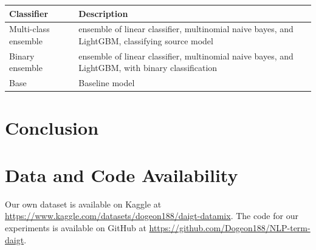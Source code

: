 \documentclass[conference]{IEEEtran}
\begin{document}
\begin{table}[htbp]
  \begin{tabular}{ll}
    \hline
    \textbf{Classifier} & \textbf{Description} \\
    \hline
    Multi-class ensemble & ensemble of linear classifier, multinomial naive bayes, and LightGBM, classifying source model \\
    Binary ensemble & ensemble of linear classifier, multinomial naive bayes, and LightGBM, with binary classification \\
    Base & Baseline model \\
    \hline
    
  \end{tabular}
\end{table}


\section{Conclusion}

\section{Data and Code Availability}

Our own dataset is available on Kaggle at \url{https://www.kaggle.com/datasets/dogeon188/daigt-datamix}. The code for our experiments is available on GitHub at \url{https://github.com/Dogeon188/NLP-term-daigt}.



\end{document}
